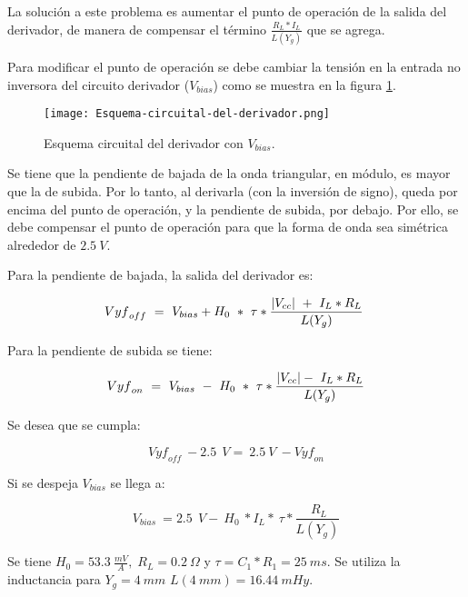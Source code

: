 La solución a este problema es aumentar el punto de operación de la salida del derivador, de manera de compensar el término $\frac{R_L*I_L}{L(Y_g)}$ que se agrega.

Para modificar el punto de operación se debe cambiar la tensión en la entrada no inversora del circuito derivador ($V_{bias}$) como se muestra en la figura \ref{fig:img_Esquema-circuital-del-derivador}. 

\begin{figure}[H]
	\centering
	\texttt{[image: Esquema-circuital-del-derivador.png]}
	\caption{Esquema circuital del derivador con $V_{bias}$.}
	\label{fig:img_Esquema-circuital-del-derivador}
\end{figure}

Se tiene que la pendiente de bajada de la onda triangular, en módulo, es mayor que la de subida. Por lo tanto, al derivarla (con la inversión de signo), queda por encima del punto de operación, y la pendiente de subida, por debajo. Por ello, se debe compensar el punto de operación para que la forma de onda sea simétrica alrededor de $2.5\:V$. 

Para la pendiente de bajada, la salida del derivador es:

\begin{equation} \label{eq_Vyf-Vbias}
	{Vyf}_{off}\ =\ V_{bias}+H_0\ *\ \tau *\frac{\abs{V_{cc}}\ +\ I_L*R_L}{L(Y_g)}\ 
\end{equation}

Para la pendiente de subida se tiene:

\begin{equation} \label{eq_Vyf-Vbias2}
	{Vyf}_{on}\ =\ V_{bias}\ -\ H_0\ *\ \tau *\frac{\abs{V_{cc}} -\ I_L*R_L}{L(Y_g)}
\end{equation}

Se desea que se cumpla:

\begin{equation} \label{eq_Vyf_Vbias3}
	{Vyf}_{off}\ -2.5\ \:V=\ 2.5\ V\ -{Vyf}_{on}
\end{equation}

Si se despeja $V_{bias}$ se llega a:

\begin{equation} \label{eq_Vyf-Vbias4}
	V_{bias}\ =2.5\ \:V -\ H_0\ *I_L*\ \tau *\frac{\ R_L}{L(Y_g)}
\end{equation}

Se tiene $H_0 = 53.3\:\frac{mV}{A},\; R_L = 0.2\:\Omega$ y $\tau=C_1*R_1=25 \:ms$. Se utiliza la inductancia para $Y_g=4\:mm$ $L(4\:mm) = 16.44\:mHy$.

